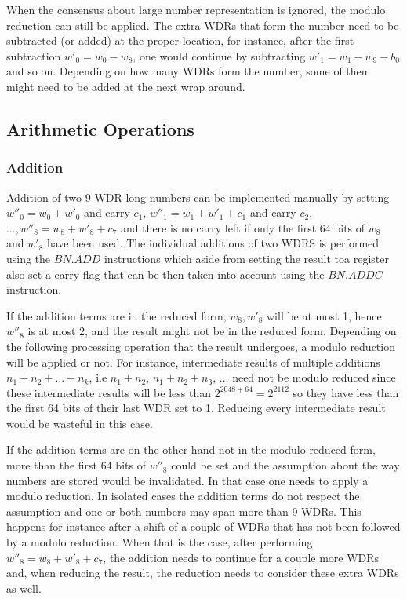 When the consensus about large number representation is ignored, the modulo reduction can still be applied. The extra WDRs that form the number need to be subtracted (or added) at the proper location, for instance, after the first subtraction $w'_0 = w_0 - w_8$, one would continue by subtracting $w'_1 = w_1 - w_9 - b_0$ and so on. Depending on how many WDRs form the number, some of them might need to be added at the next wrap around.


\subsection{Arithmetic Operations}

\subsubsection{Addition}

Addition of two 9 WDR long numbers can be implemented manually by setting $w''_0 = w_0 + w'_0$ and carry $c_1$, $w''_1 = w_1 + w'_1 + c_1$ and carry $c_2$, $\ldots, w''_8 = w_8 + w'_8 + c_7$ and there is no carry left if only the first 64 bits of $w_8$ and $w'_8$ have been used. The individual additions of two WDRS is performed using the $BN.ADD$ instructions which aside from setting the result toa register also set a carry flag that can be then taken into account using the $BN.ADDC$ instruction.

If the addition terms are in the reduced form, $w_8, w'_8$ will be at most 1, hence $w''_8$ is at most 2, and the result might not be in the reduced form. Depending on the following processing operation that the result undergoes, a modulo reduction will be applied or not. For instance, intermediate results of multiple additions $n_1 + n_2 + \ldots + n_k$, i.e $n_1 + n_2$, $n_1 + n_2 + n_3$, $\ldots$ need not be modulo reduced since these intermediate results will be less than $2^{2048 + 64} = 2^{2112}$ so they have less than the first 64 bits of their last WDR set to 1. Reducing every intermediate result would be wasteful in this case.

If the addition terms are on the other hand not in the modulo reduced form, more than the first 64 bits of $w''_8$ could be set and the assumption about the way numbers are stored would be invalidated. In that case one needs to apply a modulo reduction. In isolated cases the addition terms do not respect the assumption and one or both numbers may span more than 9 WDRs. This happens for instance after a shift of a couple of WDRs that has not been followed by a modulo reduction. When that is the case, after performing $w''_8 = w_8 + w'_8 + c_7$, the addition needs to continue for a couple more WDRs and, when reducing the result, the reduction needs to consider these extra WDRs as well.

